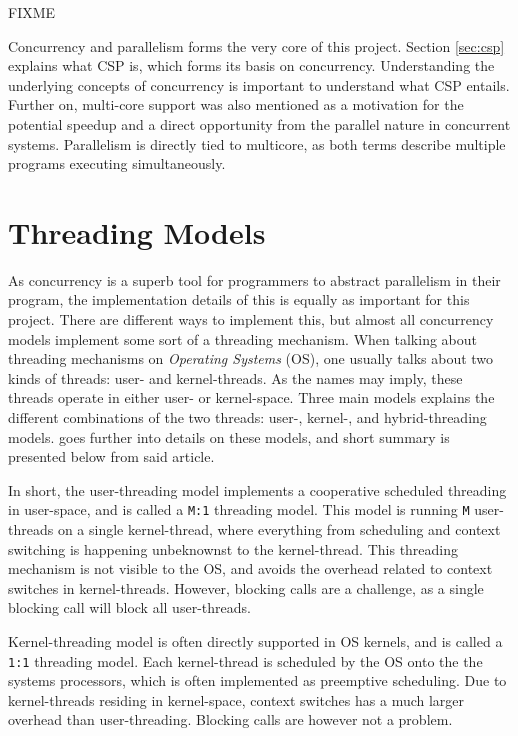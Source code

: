 FIXME

Concurrency and parallelism forms the very core of this project. Section \ref{sec:csp} explains what CSP is, which forms its basis on concurrency. Understanding the underlying concepts of concurrency is important to understand what CSP entails. Further on, multi\hyp{}core support was also mentioned as a motivation for the potential speedup and a direct opportunity from the parallel nature in concurrent systems. Parallelism is directly tied to multicore, as both terms describe multiple programs executing simultaneously. 


\section{Threading Models}
\label{sec:threading_models}

As concurrency is a superb tool for programmers to abstract parallelism in their program, the implementation details of this is equally as important for this project. There are different ways to implement this, but almost all concurrency models implement some sort of a threading mechanism. When talking about threading mechanisms on \textit{Operating Systems} (OS), one usually talks about two kinds of threads: user- and kernel-threads. As the names may imply, these threads operate in either user- or kernel-space. Three main models explains the different combinations of the two threads: user-, kernel-, and hybrid-threading models. \citet{c++csp2} goes further into details on these models, and short summary is presented below from said article.

In short, the user\hyp{}threading model implements a cooperative scheduled threading in user\hyp{}space, and is called a \texttt{M:1} threading model. This model is running \texttt{M} user-threads on a single kernel\hyp{}thread, where everything from scheduling and context switching is happening unbeknownst to the kernel\hyp{}thread. This threading mechanism is not visible to the OS, and avoids the overhead related to context switches in kernel-threads. However, blocking calls are a challenge, as a single blocking call will block all user-threads.

Kernel\hyp{}threading model is often directly supported in OS kernels, and is called a \texttt{1:1} threading model. Each kernel\hyp{}thread is scheduled by the OS onto the the systems processors, which is often implemented as preemptive scheduling. Due to kernel\hyp{}threads residing in kernel\hyp{}space, context switches has a much larger overhead than user\hyp{}threading. Blocking calls are however not a problem. 

